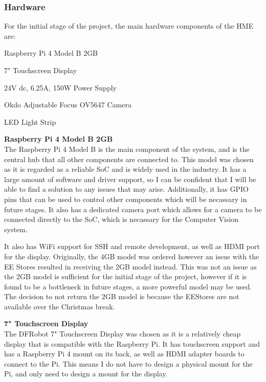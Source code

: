 \subsubsection{Hardware} \label{sec:hardware}
For the initial stage of the project, the main hardware components of the HME are:
\begin{mylist}
  \item Raspberry Pi 4 Model B 2GB
  \item 7" Touchscreen Display
  \item 24V dc, 6.25A, 150W Power Supply
  \item Okdo Adjustable Focus OV5647 Camera
  \item LED Light Strip
\end{mylist}
\textbf{Raspberry Pi 4 Model B 2GB} \\
The Raspberry Pi 4 Model B is the main component of the system, and is the central hub that all other components are connected to.
This model was chosen as it is regarded as a reliable SoC and is widely used in the industry. It has a large amount of software
and driver support, so I can be confident that I will be able to find a solution to any issues that may arise. Additionally, 
it has GPIO pins that can be used to control other components which will be necassary in future stages. It also has a 
dedicated camera port which allows for a camera to be connected directly to the SoC, which is necassary for the Computer Vision system.

It also has WiFi support for SSH and remote development, as well as HDMI port for the display.
Originally, the 4GB model was ordered however an issue with the EE Stores resulted in receiving the 2GB model instead.
This was not an issue as the 2GB model is sufficient for the initial stage of the project, however if it is found to be a bottleneck
in future stages, a more powerful model may be used. The decision to not return the 2GB model is because the EEStores are not
available over the Christmas break.

\vspace{1em}
\noindent
\textbf{7" Touchscreen Display} \\
The DFRobot 7" Touchscreen Display was chosen as it is a relatively cheap display that is compatible with the Raspberry Pi.
It has touchscreen support and has a Raspberry Pi 4 mount on its back, as well as HDMI adapter boards to connect to the Pi.
This means I do not have to design a physical mount for the Pi, and only need to design a mount for the display.

